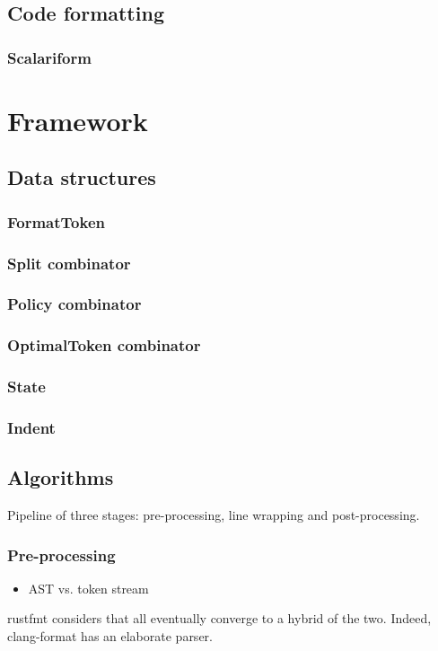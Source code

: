 \documentclass[11pt,a4paper]{article}
\begin{document}
\subsection{Code formatting} \subsubsection{Scalariform}
\section{Framework}
\subsection{Data structures} \subsubsection{FormatToken} \subsubsection{Split combinator} \subsubsection{Policy combinator} \subsubsection{OptimalToken combinator} \subsubsection{State} \subsubsection{Indent} \subsection{Algorithms} Pipeline of three stages: pre-processing, line wrapping and post-processing.
\subsubsection{Pre-processing}
\begin{itemize}
\item
 AST vs.
 token stream
\end{itemize}
rustfmt considers that all eventually converge to a hybrid of the two.
Indeed, clang-format has an elaborate parser.
\end{document}
